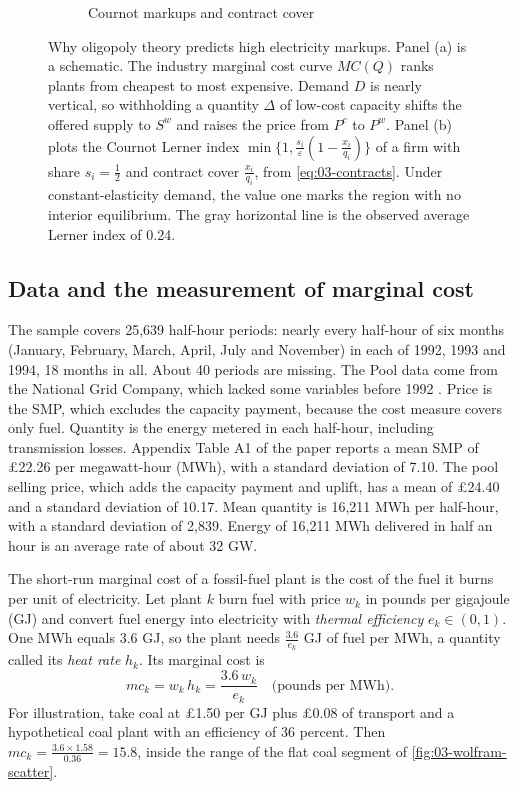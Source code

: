 \begin{figure}[tbp]
\begin{subfigure}[b]{0.48\textwidth}
\caption{Cournot markups and contract cover}
\end{subfigure}
\caption{Why oligopoly theory predicts high electricity markups. Panel (a) is a schematic. The industry marginal cost
curve $MC(Q)$ ranks plants from cheapest to most expensive. Demand $D$ is nearly vertical, so withholding a quantity
$\Delta$ of low-cost capacity shifts the offered supply to $S^{w}$ and raises the price from $P^{c}$ to $P^{w}$. Panel
(b) plots the Cournot Lerner index $\min\{1, \frac{s_i}{\varepsilon}(1 - \frac{x_i}{q_i})\}$ of a firm with share
$s_i = \frac{1}{2}$ and contract cover $\frac{x_i}{q_i}$, from \eqref{eq:03-contracts}. Under constant-elasticity
demand, the value one marks the region with no interior equilibrium. The gray horizontal line is the observed average Lerner index of 0.24.}
\label{fig:03-merit-order}
\end{figure}

\subsection{Data and the measurement of marginal cost}\label{sec:03-wolfram-data}

The sample covers 25,639 half-hour periods: nearly every half-hour of six months (January, February, March, April,
July and November) in each of 1992, 1993 and 1994, 18 months in all. About 40 periods are missing. The Pool data come
from the National Grid Company, which lacked some variables before 1992 \citep[pp.~810, 822 and n.~49]{Wolfram1999}.
Price is the SMP, which excludes the capacity payment, because the cost measure covers only fuel. Quantity is the
energy metered in each half-hour, including transmission losses. Appendix Table A1 of the paper reports a mean SMP of
\pounds 22.26 per megawatt-hour (MWh), with a standard deviation of 7.10. The pool selling price, which adds the
capacity payment and uplift, has a mean of \pounds 24.40 and a standard deviation of 10.17. Mean quantity is 16,211
MWh per half-hour, with a standard deviation of 2,839. Energy of 16,211 MWh delivered in half an hour is an average
rate of about 32 GW.

The short-run marginal cost of a fossil-fuel plant is the cost of the fuel it burns per unit of electricity. Let plant
$k$ burn fuel with price $w_k$ in pounds per gigajoule (GJ) and convert fuel energy into electricity with
\emph{thermal efficiency} $e_k \in (0, 1)$. One MWh equals 3.6 GJ, so the plant needs $\frac{3.6}{e_k}$ GJ of fuel per
MWh, a quantity called its \emph{heat rate} $h_k$. Its marginal cost is
\begin{equation}\label{eq:03-plant-mc}
mc_k = w_k\, h_k = \frac{3.6\, w_k}{e_k} \quad \text{(pounds per MWh)}.
\end{equation}
For illustration, take coal at \pounds 1.50 per GJ plus \pounds 0.08 of transport and a hypothetical coal plant with an
efficiency of 36 percent. Then $mc_k = \frac{3.6 \times 1.58}{0.36} = 15.8$, inside the range of the flat coal segment of
\cref{fig:03-wolfram-scatter}.

